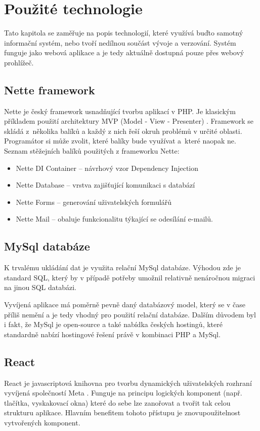 \chapter{Použité technologie}
Tato kapitola se zaměřuje na popis technologií, které využívá buďto samotný informační systém, nebo tvoří nedílnou součást vývoje a verzování. Systém funguje jako webová aplikace a je tedy aktuálně dostupná pouze přes webový prohlížeč.

\section{Nette framework}

Nette je český framework usnadňující tvorbu aplikací v PHP. Je klasickým příkladem použití architektury MVP (Model - View - Presenter) \cite{nette-itnetwork}.  Framework se skládá z~několika balíků a každý z nich řeší okruh problémů v určité oblasti. Programátor si může zvolit, které balíky bude využívat a~které naopak ne. 
Seznam stěžejních balíků použitých z frameworku Nette:
\begin{itemize}
  \item Nette DI Container -- návrhový vzor Dependency Injection
  \item Nette Database -- vrstva zajišťující komunikaci s databází
  \item Nette Forms -- generování uživatelských formulářů
  \item Nette Mail -- obaluje funkcionalitu týkající se odesílání e-mailů.

\end{itemize}

\section{MySql databáze}

K trvalému ukládání dat je využita relační MySql databáze. Výhodou zde je standard SQL, který by v případě potřeby umožnil relativně nenáročnou migraci na jinou SQL databázi.


Vyvíjená aplikace má poměrně pevně daný databázový model, který se v čase příliš nemění a je tedy vhodný pro použití relační databáze. Dalším důvodem byl i fakt, že MySql je open-source a také nabídka českých hostingů, které standardně nabízí hostingové řešení právě v kombinaci PHP a MySql.

\section{React}
React je javascriptová knihovna pro tvorbu dynamických uživatelských rozhraní vyvíjená společností Meta \cite{react}.  Funguje na principu logických komponent (např. tlačítka, vyskakovací okna) které do sebe lze zanořovat a tvořit tak celou strukturu aplikace. Hlavním benefitem tohoto přístupu je znovupoužitelnost vytvořených komponent.


